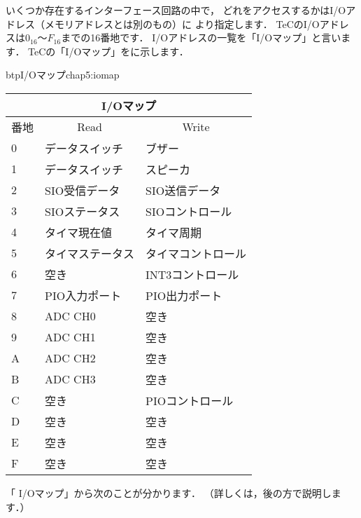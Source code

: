 いくつか存在するインターフェース回路の中で，
どれをアクセスするかはI/Oアドレス（メモリアドレスとは別のもの）に
より指定します．
TeCのI/Oアドレスは$0_{16}$〜$F_{16}$までの16番地です．
I/Oアドレスの一覧を「I/Oマップ」と言います．
TeCの「I/Oマップ」をに示します．

\begin{mytable}{btp}{I/Oマップ}{chap5:iomap}
  \small\begin{tabular}{| l | l | l |}
  \hline
  \multicolumn{3}{|c|}{I/Oマップ} \\
  \hline
  番地 & \multicolumn{1}{|c|}{Read} & \multicolumn{1}{|c|}{Write} \\
  \hline
  0 & データスイッチ   & ブザー \\
  1 & データスイッチ   & スピーカ \\
  2 & SIO受信データ    & SIO送信データ \\
  3 & SIOステータス    & SIOコントロール \\
  4 & タイマ現在値     & タイマ周期 \\
  5 & タイマステータス & タイマコントロール \\
  6 & 空き             & INT3コントロール \\
  7 & PIO入力ポート    & PIO出力ポート \\
  8 & ADC CH0          & 空き \\
  9 & ADC CH1          & 空き \\
  A & ADC CH2          & 空き \\
  B & ADC CH3          & 空き \\
  C & 空き             & PIOコントロール \\
  D & 空き             & 空き \\
  E & 空き             & 空き \\
  F & 空き             & 空き \\
  \hline
  \end{tabular}
\end{mytable}

「 I/Oマップ」から次のことが分かります．
（詳しくは，後の方で説明します．）

